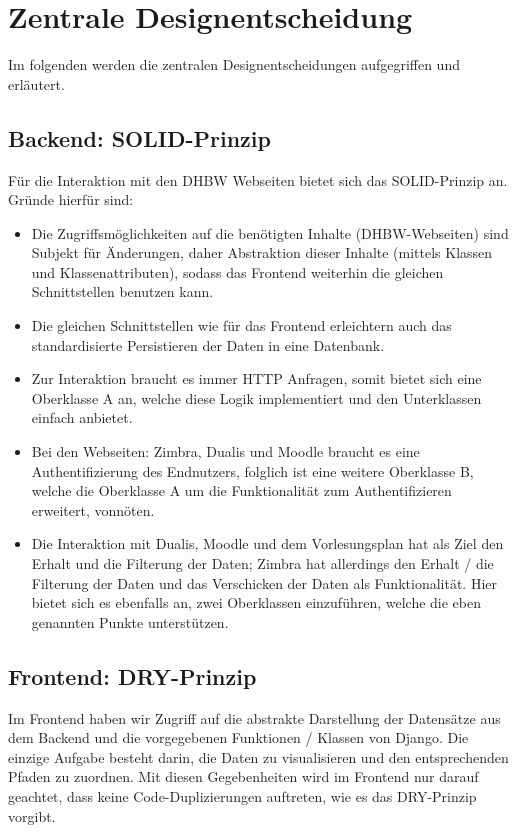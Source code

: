 \documentclass[a4paper,11pt]{scrartcl}
\begin{document}
\section{Zentrale Designentscheidung}
Im folgenden werden die zentralen Designentscheidungen aufgegriffen und erläutert.
    \subsection{Backend: SOLID-Prinzip}
Für die Interaktion mit den DHBW Webseiten bietet sich das SOLID-Prinzip an. \\
Gründe hierfür sind:
\begin{itemize}
    \item{Die Zugriffsmöglichkeiten auf die benötigten Inhalte (DHBW-Webseiten) sind Subjekt für Änderungen,
    daher Abstraktion dieser Inhalte (mittels Klassen und Klassenattributen),
    sodass das Frontend weiterhin die gleichen Schnittstellen benutzen kann.}
    \item{Die gleichen Schnittstellen wie für das Frontend erleichtern auch das standardisierte Persistieren der Daten
    in eine Datenbank.}
    \item{Zur Interaktion braucht es immer HTTP Anfragen, somit bietet sich eine Oberklasse A an,
    welche diese Logik implementiert und den Unterklassen einfach anbietet.}
    \item{Bei den Webseiten: Zimbra, Dualis und Moodle braucht es eine Authentifizierung des Endnutzers,
    folglich ist eine weitere Oberklasse B, welche die Oberklasse A um die Funktionalität zum Authentifizieren erweitert, vonnöten.}
    \item{Die Interaktion mit Dualis, Moodle und dem Vorlesungsplan hat als Ziel den Erhalt und die Filterung der Daten;
    Zimbra hat allerdings den Erhalt / die Filterung der Daten und das Verschicken der Daten als Funktionalität.
    Hier bietet sich es ebenfalls an, zwei Oberklassen einzuführen, welche die eben genannten Punkte unterstützen.}
\end{itemize}

    \subsection{Frontend: DRY-Prinzip}
Im Frontend haben wir Zugriff auf die abstrakte Darstellung der \textquotedbl Datensätze\textquotedbl{} aus dem Backend und
die vorgegebenen Funktionen / Klassen von Django. Die einzige Aufgabe besteht darin, die Daten zu visualisieren und
den entsprechenden Pfaden zu zuordnen. Mit diesen Gegebenheiten wird im Frontend \textquotedbl nur\textquotedbl{}
darauf geachtet, dass keine Code-Duplizierungen auftreten, wie es das DRY-Prinzip vorgibt.
\end{document}
